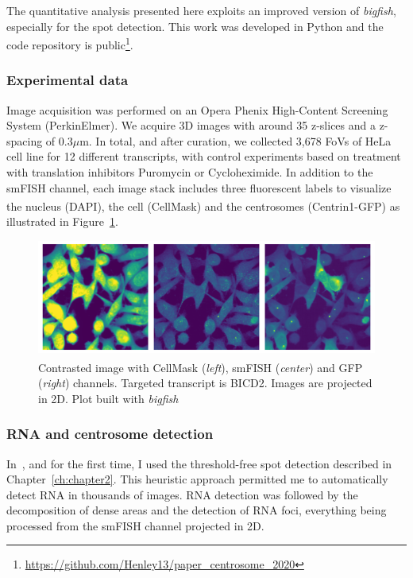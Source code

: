 The quantitative analysis presented here exploits an improved version of \emph{bigfish}, especially for the spot detection.
This work was developed in Python and the code repository is public\footnote{\url{https://github.com/Henley13/paper_centrosome_2020}}.

\subsubsection{Experimental data}

Image acquisition was performed on an Opera Phenix High-Content Screening System (PerkinElmer).
We acquire 3D images with around 35 z-slices and a z-spacing of 0.3$\mu$m.
In total, and after curation, we collected 3,678 \ac{FoV}s of HeLa cell line for 12 different transcripts, with control experiments based on treatment with translation inhibitors Puromycin or Cycloheximide.
In addition to the \ac{smFISH} channel, each image stack includes three fluorescent labels to visualize the nucleus (DAPI), the cell (CellMask\textsuperscript{\texttrademark}) and the centrosomes (Centrin1-\ac{GFP}) as illustrated in Figure~\ref{fig:fov_adham}.

\begin{figure}[]
    \centering
    \includegraphics[width=\textwidth]{figures/chapter5/FoV_BICD2}
    \caption[Contrasted image with CellMask\textsuperscript{\texttrademark}, smFISH and GFP channels]{Contrasted image with CellMask\textsuperscript{\texttrademark} (\textit{left}), smFISH (\textit{center}) and GFP (\textit{right}) channels.
	Targeted transcript is BICD2.
	Images are projected in 2D.
	Plot built with \emph{bigfish}}
    \label{fig:fov_adham}
\end{figure}

\subsubsection{RNA and centrosome detection}

In~\cite{safieddine_choreography_2021}, and for the first time, I used the threshold-free spot detection described in Chapter~\ref{ch:chapter2}.
This heuristic approach permitted me to automatically detect RNA in thousands of images.
\ac{RNA} detection was followed by the decomposition of dense areas and the detection of \ac{RNA} foci, everything being processed from the \ac{smFISH} channel projected in 2D.

